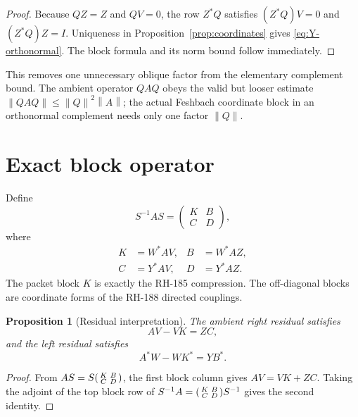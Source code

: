 \documentclass[12pt]{article}
\newtheorem{proposition}[theorem]{Proposition}
\theoremstyle{remark}
\newcommand{\norm}[1]{\left\lVert#1\right\rVert}
\begin{document}
\begin{proof}
Because $QZ=Z$ and $QV=0$, the row $Z^*Q$ satisfies
$(Z^*Q)V=0$ and $(Z^*Q)Z=I$.  Uniqueness in
Proposition~\ref{prop:coordinates} gives \eqref{eq:Y-orthonormal}.  The block
formula and its norm bound follow immediately.
\end{proof}

This removes one unnecessary oblique factor from the elementary complement
bound.  The ambient operator $QAQ$ obeys the valid but looser estimate
$\norm{QAQ}\le\norm Q^2\norm A$; the actual Feshbach coordinate block in an
orthonormal complement needs only one factor $\norm Q$.

\section{Exact block operator}

Define
\begin{equation}\label{eq:blocks}
 S^{-1}AS=
 \begin{pmatrix}
 K&B\\C&D
 \end{pmatrix},
\end{equation}
where
\begin{align}
 K&=W^*AV,
 &B&=W^*AZ,
 \label{eq:KB}\\
 C&=Y^*AV,
 &D&=Y^*AZ.
 \label{eq:CD}
\end{align}
The packet block $K$ is exactly the RH-185 compression.  The off-diagonal
blocks are coordinate forms of the RH-188 directed couplings.

\begin{proposition}[Residual interpretation]\label{prop:residual}
The ambient right residual satisfies
\begin{equation}\label{eq:right-residual}
 AV-VK=ZC,
\end{equation}
and the left residual satisfies
\begin{equation}\label{eq:left-residual}
 A^*W-WK^*=YB^*.
\end{equation}
\end{proposition}

\begin{proof}
From $AS=S\begin{psmallmatrix}K&B\\C&D\end{psmallmatrix}$, the first block
column gives $AV=VK+ZC$.  Taking the adjoint of the top block row of
$S^{-1}A=\begin{psmallmatrix}K&B\\C&D\end{psmallmatrix}S^{-1}$ gives the
second identity.
\end{proof}
\end{document}
